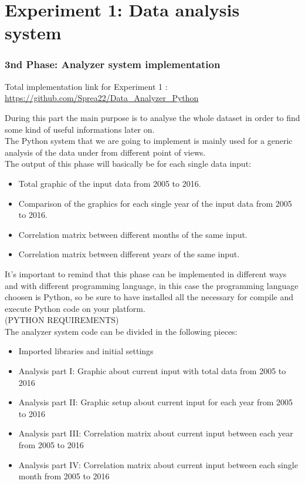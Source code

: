 \part{Experiment 1: Data analysis system}
\section{3nd Phase: Analyzer system implementation}
Total implementation link for Experiment 1 : \\
\hyperlink{https://github.com/Sprea22/Data_Analyzer_Python}{https://github.com/Sprea22/Data\_Analyzer\_Python}

During this part the main purpose is to analyse the whole dataset in order to find some kind of useful informations later on. \\
The Python system that we are going to implement is mainly used for a generic analysis of the data under from different point of views.\\
The output of this phase will basically be for each single data input:
\begin{itemize}
\item Total graphic of the input data from 2005 to 2016.
\item Comparison of the graphics for each single year of the input data from 2005 to 2016.
\item Correlation matrix between different months of the same input.
\item Correlation matrix between different years of the same input.
\end{itemize}


It's important to remind that this phase can be implemented in different ways and with different programming language, in this case the programming language choosen is Python, so be sure to have installed all the necessary for compile and execute Python code on your platform.\\
(PYTHON REQUIREMENTS)\\
The analyzer system code can be divided in the following pieces:
\begin{itemize}
\item Imported libraries and initial settings
\item Analysis part I: Graphic about current input with total data from 2005 to 2016
\item Analysis part II: Graphic setup about current input for each year from 2005 to 2016
\item Analysis part III: Correlation matrix about current input between each year from 2005 to 2016 
\item Analysis part IV: Correlation matrix about current input between each single month from 2005 to 2016
\end{itemize}

